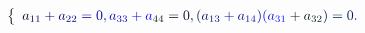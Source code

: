 \documentclass[12pt]{article}
\begin{document}
\makeatletter
\renewcommand*{\@textcolor}[3]{%
  \protect\leavevmode
  \begingroup
    \color#1{#2}#3%
  \endgroup
}
\makeatother
\begin{displaymath}
\mathcolor[RGB]{0,0,15}{\left\{} \begin{array} {rl} \mathcolor[RGB]{0,0,30}{\textstyle} { \mathcolor[RGB]{0,0,45}{a} _ { \mathcolor[RGB]{0,0,60}{1} \mathcolor[RGB]{0,0,75}{1} } \mathcolor[RGB]{0,0,90}{+} \mathcolor[RGB]{0,0,105}{a} _ { \mathcolor[RGB]{0,0,120}{2} \mathcolor[RGB]{0,0,135}{2} } \mathcolor[RGB]{0,0,150}{=} \mathcolor[RGB]{0,0,165}{0} \mathcolor[RGB]{0,0,180}{,} \mathcolor[RGB]{0,0,195}{a} _ { \mathcolor[RGB]{0,0,210}{3} \mathcolor[RGB]{0,0,225}{3} } \mathcolor[RGB]{0,0,240}{+} \mathcolor[RGB]{0,0,255}{a} _ { \mathcolor[RGB]{0,15,0}{4} \mathcolor[RGB]{0,15,15}{4} } \mathcolor[RGB]{0,15,30}{=} \mathcolor[RGB]{0,15,45}{0} \mathcolor[RGB]{0,15,60}{,} \mathcolor[RGB]{0,15,75}{(} \mathcolor[RGB]{0,15,90}{a} _ { \mathcolor[RGB]{0,15,105}{1} \mathcolor[RGB]{0,15,120}{3} } \mathcolor[RGB]{0,15,135}{+} \mathcolor[RGB]{0,15,150}{a} _ { \mathcolor[RGB]{0,15,165}{1} \mathcolor[RGB]{0,15,180}{4} } \mathcolor[RGB]{0,15,195}{)} \mathcolor[RGB]{0,15,210}{(} \mathcolor[RGB]{0,15,225}{a} _ { \mathcolor[RGB]{0,15,240}{3} \mathcolor[RGB]{0,15,255}{1} } \mathcolor[RGB]{0,30,0}{+} \mathcolor[RGB]{0,30,15}{a} _ { \mathcolor[RGB]{0,30,30}{3} \mathcolor[RGB]{0,30,45}{2} } \mathcolor[RGB]{0,30,60}{)} \mathcolor[RGB]{0,30,75}{=} \mathcolor[RGB]{0,30,90}{0} \mathcolor[RGB]{0,30,105}{.} } \end{array} \mathcolor[RGB]{0,30,120}{\right.}
\end{displaymath}
\end{document}
